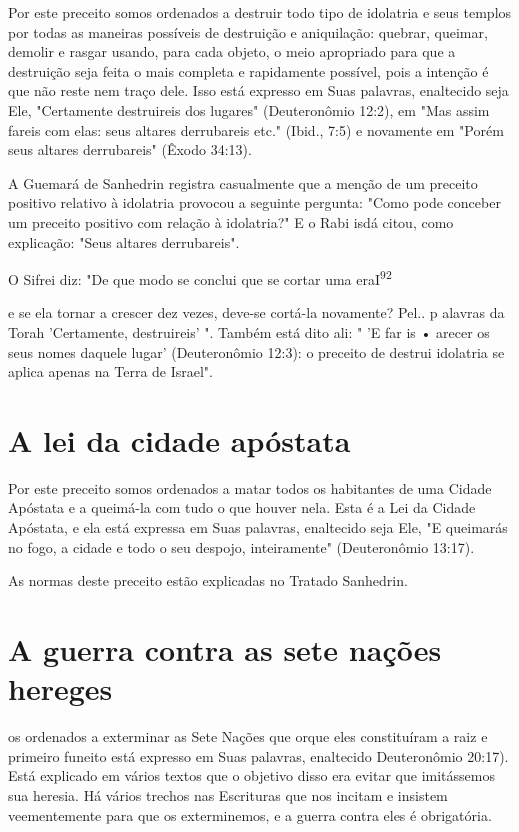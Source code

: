 \begin{itemize}
\begin{enumrate}
\begin{itemize}
\begin{itemize}
\begin{itemize}
Por este preceito somos ordenados a destruir todo tipo de idolatria e
seus templos por todas as maneiras possíveis de destruição e
aniquilação: que­brar, queimar, demolir e rasgar usando, para cada
objeto, o meio apropriado para que a destruição seja feita o mais
completa e rapidamente possível, pois a intenção é que não reste nem
traço dele. Isso está expresso em Suas palavras, enaltecido seja Ele,
"Certamente destruireis dos lugares" (Deuteronômio 12:2), em "Mas assim
fareis com elas: seus altares derrubareis etc." (Ibid., 7:5) e
nova­mente em "Porém seus altares derrubareis" (Êxodo 34:13).

A Guemará de Sanhedrin registra casualmente que a menção de um preceito
positivo relativo à idolatria provocou a seguinte pergunta: "Como pode
conceber um preceito positivo com relação à idolatria?" E o Rabi isdá
citou, como explicação: "Seus altares derrubareis".

O Sifrei diz: "De que modo se conclui que se cortar uma
eraI\textsuperscript{92}

e se ela tornar a crescer dez vezes, deve-se cortá-la novamente? Pel.. p
alavras da Torah 'Certamente, destruireis' ". Também está dito ali: " 'E
far is • arecer os seus nomes daquele lugar' (Deuteronômio 12:3): o
preceito de destrui ido­latria se aplica apenas na Terra de Israel".

\section{A lei da cidade apóstata}

Por este preceito somos ordenados a matar todos os habitantes de uma
Cidade Apóstata e a queimá-la com tudo o que houver nela. Esta é a Lei
da Cidade Apóstata, e ela está expressa em Suas palavras, enaltecido
seja Ele, "E queimarás no fogo, a cidade e todo o seu despojo,
inteiramente" (Deuteronômio 13:17).


As normas deste preceito estão explicadas no Tratado Sanhedrin.


\section{A guerra contra as sete nações hereges}

os ordenados a exterminar as Sete Nações que orque eles constituíram a
raiz e primeiro fun­eito está expresso em Suas palavras, enaltecido
Deuteronômio 20:17). Está explicado em vários textos que o objetivo
disso era evitar que imitássemos sua heresia. Há vários trechos nas
Escrituras que nos incitam e insistem veementemente para que os
exterminemos, e a guerra contra eles é obrigatória.



\end{itemize}
\end{itemize}
\end{itemize}
\end{enumrate}
\end{itemize}
